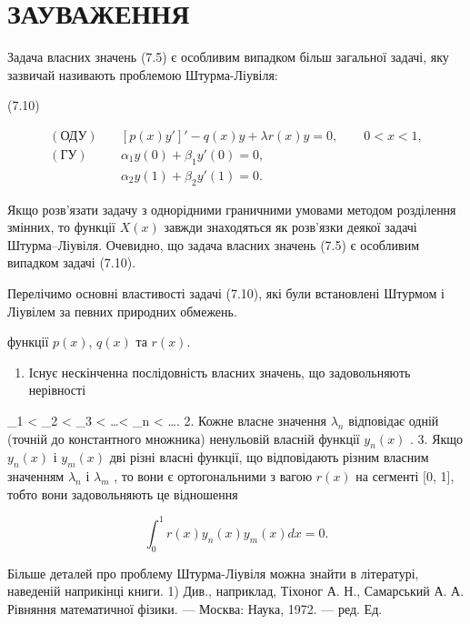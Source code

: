 \documentclass[
  ukrainian,
]{article}
\providecommand{\tightlist}{%
  \setlength{\itemsep}{0pt}\setlength{\parskip}{0pt}}
\begin{document}
\section{ЗАУВАЖЕННЯ}\label{ux437ux430ux443ux432ux430ux436ux435ux43dux43dux44f}

Задача власних значень (7.5) є особливим випадком більш загальної
задачі, яку зазвичай називають проблемою Штурма-Ліувіля:

(7.10)

\[
\begin{aligned}
(\text{ОДУ})\quad & [p(x)y']' - q(x)y + \lambda r(x)y = 0,\qquad 0<x<1,\\
(\text{ГУ})\quad & \alpha_1 y(0) + \beta_1 y'(0)=0,\\
& \alpha_2 y(1) + \beta_2 y'(1)=0.
\end{aligned}
\]

Якщо розв'язати задачу з однорідними граничними умовами методом
розділення змінних, то функції \(X(x)\) завжди знаходяться як розв'язки
деякої задачі Штурма--Ліувіля. Очевидно, що задача власних значень (7.5)
є особливим випадком задачі (7.10).

Перелічимо основні властивості задачі (7.10), які були встановлені
Штурмом і Ліувілем за певних природних обмежень.

функції \(p(x)\), \(q(x)\) та \(r(x)\).

\begin{enumerate}
\def\labelenumi{\arabic{enumi}.}
\tightlist
\item
  Існує нескінченна послідовність власних значень, що задовольняють
  нерівності
\end{enumerate}

\lambda\_1 \textless{} \lambda\_2 \textless{} \lambda\_3 \textless{}
\ldots \textless{} \lambda\_n \textless{} \ldots \to \infty . 2. Кожне
власне значення \(\lambda_n\) відповідає одній (точній до константного
множника) ненульовій власній функції \(y_n(x)\) . 3. Якщо \(y_n(x)\) і
\(y_m(x)\) дві різні власні функції, що відповідають різним власним
значенням \(\lambda_n\) і \(\lambda_m\) , то вони є ортогональними з
вагою \(r(x)\) на сегменті {[}0, 1{]}, тобто вони задовольняють це
відношення

\[
\int_{0}^{1} r(x) y_{n}(x) y_{m}(x) dx = 0.
\]

Більше деталей про проблему Штурма-Ліувіля можна знайти в літературі,
наведеній наприкінці книги. 1) Див., наприклад, Тіхоног А. Н.,
Самарський А. А. Рівняння математичної фізики. --- Москва: Наука, 1972.
--- ред. Ед.
\end{document}
